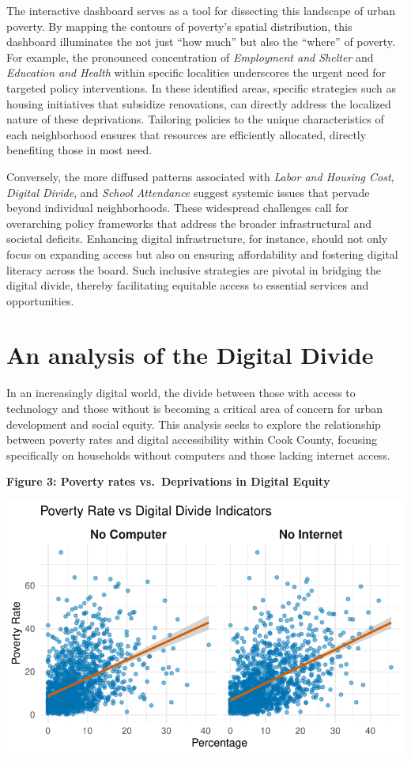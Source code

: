 \documentclass[
  letterpaper,
  DIV=11,
  numbers=noendperiod]{scrreprt}
\begin{document}
The interactive dashboard serves as a tool for dissecting this landscape
of urban poverty. By mapping the contours of poverty's spatial
distribution, this dashboard illuminates the not just ``how much'' but
also the ``where'' of poverty. For example, the pronounced concentration
of \emph{Employment and Shelter} and \emph{Education and Health} within
specific localities underscores the urgent need for targeted policy
interventions. In these identified areas, specific strategies such as
housing initiatives that subsidize renovations, can directly address the
localized nature of these deprivations. Tailoring policies to the unique
characteristics of each neighborhood ensures that resources are
efficiently allocated, directly benefiting those in most need.

Conversely, the more diffused patterns associated with \emph{Labor and
Housing Cost}, \emph{Digital Divide}, and \emph{School Attendance}
suggest systemic issues that pervade beyond individual neighborhoods.
These widespread challenges call for overarching policy frameworks that
address the broader infrastructural and societal deficits. Enhancing
digital infrastructure, for instance, should not only focus on expanding
access but also on ensuring affordability and fostering digital literacy
across the board. Such inclusive strategies are pivotal in bridging the
digital divide, thereby facilitating equitable access to essential
services and opportunities.


\chapter{An analysis of the Digital
Divide}\label{an-analysis-of-the-digital-divide}

In an increasingly digital world, the divide between those with access
to technology and those without is becoming a critical area of concern
for urban development and social equity. This analysis seeks to explore
the relationship between poverty rates and digital accessibility within
Cook County, focusing specifically on households without computers and
those lacking internet access.

\textbf{Figure 3: Poverty rates vs.~Deprivations in Digital Equity}

\includegraphics{digital_divide_analysis_files/figure-pdf/viz3_etl-1.pdf}
\end{document}
